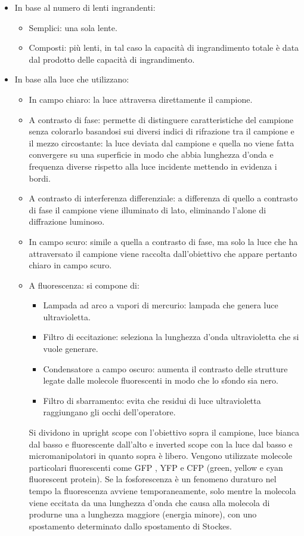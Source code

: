 \begin{itemize}
	\item In base al numero di lenti ingrandenti: 
		\begin{itemize}
			\item Semplici: una sola lente.
			\item Composti: pi\`u lenti, in tal caso la capacit\`a di ingrandimento totale \`e data dal prodotto delle capacit\`a di ingrandimento. 
		\end{itemize}
	\item In base alla luce che utilizzano:
		\begin{itemize}
			\item In campo chiaro: la luce attraversa direttamente il campione.
			\item A contrasto di fase: permette di distinguere caratteristiche del campione senza colorarlo basandosi sui diversi indici di rifrazione tra il campione e il 
				mezzo circostante: la luce deviata dal campione e quella no viene fatta convergere su una superficie in modo che abbia lunghezza d'onda e frequenza
				diverse rispetto alla luce incidente mettendo in evidenza i bordi.
			\item A contrasto di interferenza differenziale: a differenza di quello a contrasto di fase il campione viene illuminato di lato, eliminando l'alone di 
				diffrazione luminoso.
			\item In campo scuro: simile a quella a contrasto di fase, ma solo la luce che ha attraversato il campione viene raccolta dall'obiettivo che appare pertanto 
				chiaro in campo scuro. 
			\item A fluorescenza: si compone di:
				\begin{itemize}
					\item Lampada ad arco a vapori di mercurio: lampada che genera luce ultravioletta.
					\item Filtro di eccitazione: seleziona la lunghezza d'onda ultravioletta che si vuole generare.
					\item Condensatore a campo oscuro: aumenta il contrasto delle strutture legate dalle molecole fluorescenti in modo che lo sfondo sia nero. 
					\item Filtro di sbarramento: evita che residui di luce ultravioletta raggiungano gli occhi dell'operatore. 
				\end{itemize}
				Si dividono in upright scope con l'obiettivo sopra il campione, luce bianca dal basso e fluorescente dall'alto e inverted scope con la luce dal basso e
				micromanipolatori in quanto sopra \`e libero. Vengono utilizzate molecole particolari fluorescenti come GFP , YFP e CFP (green, yellow e cyan fluorescent 
				protein). Se la fosforescenza \`e un fenomeno duraturo nel tempo la fluorescenza avviene temporaneamente, solo mentre la molecola viene eccitata da una 
				lunghezza d'onda che causa alla molecola di produrne una a lunghezza maggiore (energia minore), con uno spostamento determinato dallo spostamento di 
				Stockes.
		\end{itemize}
\end{itemize}
